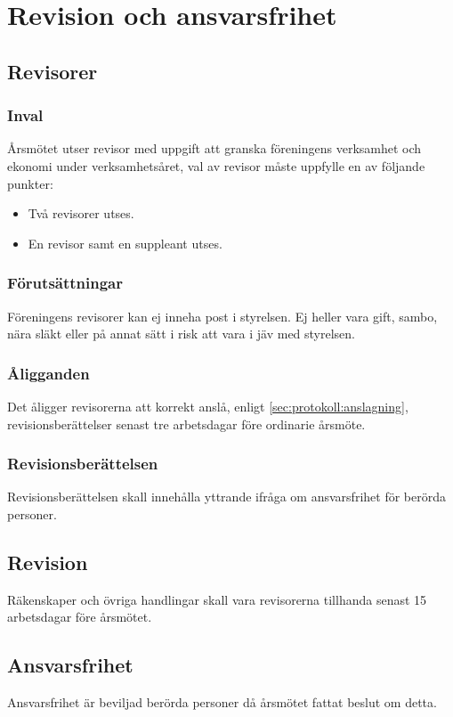 \section{Revision och ansvarsfrihet}
\subsection{Revisorer}
\subsubsection{Inval}
Årsmötet utser revisor med uppgift att granska föreningens verksamhet och ekonomi under verksamhetsåret, val av revisor måste uppfylle en av följande punkter:

\begin{itemize}
	\item Två revisorer utses.
	\item En revisor samt en suppleant utses.
\end{itemize}

\subsubsection{Förutsättningar}
Föreningens revisorer kan ej inneha post i styrelsen. Ej heller vara gift, sambo, nära släkt eller på annat sätt i risk att vara i jäv med styrelsen.

\subsubsection{Åligganden}
Det åligger revisorerna att korrekt anslå, enligt \ref{sec:protokoll:anslagning}, revisionsberättelser senast tre arbetsdagar före ordinarie årsmöte.

\subsubsection{Revisionsberättelsen}
Revisionsberättelsen skall innehålla yttrande ifråga om ansvarsfrihet för berörda personer.

\subsection{Revision}
Räkenskaper och övriga handlingar skall vara revisorerna tillhanda senast 15 arbetsdagar före årsmötet. 

\subsection{Ansvarsfrihet}
Ansvarsfrihet är beviljad berörda personer då årsmötet fattat beslut om detta. 

